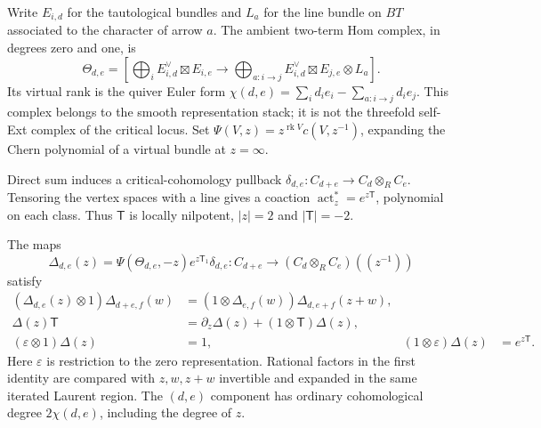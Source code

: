 Write $E_{i,d}$ for the tautological bundles and $L_a$ for the
line bundle on $BT$ associated to the character of arrow $a$.
The ambient two-term Hom complex, in degrees
zero and one, is
\[
 \Theta_{d,e}=\left[
 \bigoplus_i E_{i,d}^\vee\boxtimes E_{i,e}
 \longrightarrow
 \bigoplus_{a:i\to j}E_{i,d}^\vee\boxtimes E_{j,e}\otimes L_a
 \right].
\]
Its virtual rank is the quiver Euler form
$\chi(d,e)=\sum_i d_ie_i-\sum_{a:i\to j}d_ie_j$.
This complex belongs to the smooth representation stack; it
is not the threefold self-Ext complex of the critical locus.
Set $\Psi(V,z)=z^{\operatorname{rk}V}c(V,z^{-1})$, expanding
the Chern polynomial of a virtual bundle at $z=\infty$.

Direct sum induces a critical-cohomology pullback
$\delta_{d,e}:C_{d+e}\to C_d\otimes_R C_e$.
Tensoring the vertex spaces with a line gives a coaction
$\operatorname{act}_z^*=e^{z\mathsf T}$, polynomial on each
class. Thus $\mathsf T$ is locally nilpotent, $|z|=2$ and
$|\mathsf T|=-2$.

\begin{theorem}
\label{hall:thm:critical-vertex-coproduct}
The maps
\[
 \Delta_{d,e}(z)=\Psi(\Theta_{d,e},-z)
                     e^{z\mathsf T_1}\delta_{d,e}
 :C_{d+e}\longrightarrow(C_d\otimes_R C_e)((z^{-1}))
\]
satisfy
\begin{align*}
 (\Delta_{d,e}(z)\otimes1)\Delta_{d+e,f}(w)
   &=(1\otimes\Delta_{e,f}(w))\Delta_{d,e+f}(z+w),\\
 \Delta(z)\mathsf T
   &=\partial_z\Delta(z)+(1\otimes\mathsf T)\Delta(z),\\
 (\varepsilon\otimes1)\Delta(z)&=1,
 & (1\otimes\varepsilon)\Delta(z)&=e^{z\mathsf T}.
\end{align*}
Here $\varepsilon$ is restriction to the zero representation.
Rational factors in the first identity are compared with
$z,w,z+w$ invertible and expanded in the same iterated Laurent
region. The $(d,e)$ component has ordinary cohomological
degree $2\chi(d,e)$, including the degree of $z$.
\end{theorem}

